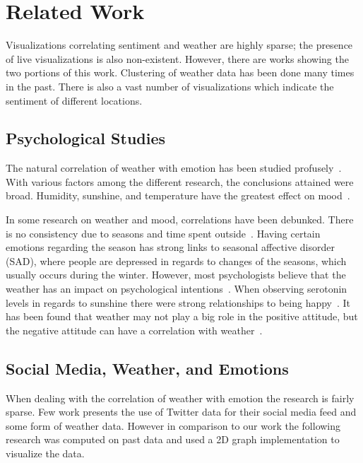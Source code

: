 \section{Related Work}

Visualizations correlating sentiment and weather are highly sparse; the presence of live visualizations is also non-existent. However, there are works showing the two portions of this work. Clustering of weather data has been done many times in the past. There is also a vast number of visualizations which indicate the sentiment of different locations.

\subsection{Psychological Studies}

The natural correlation of weather with emotion has been studied profusely~\cite{bollen2011twitter,denissen2008effects,hannak2012tweetin,howarth1984multidimensional,lambert2002effect}. With various factors among the different research, the conclusions attained were broad. Humidity, sunshine, and temperature have the greatest effect on mood~\cite{bollen2011twitter}.

In some research on weather and mood, correlations have been debunked. There is no consistency due to seasons and time spent outside~\cite{denissen2008effects}. Having certain emotions regarding the season has strong links to seasonal affective disorder (SAD), where people are depressed in regards to changes of the seasons, which usually occurs during the winter. However, most psychologists believe that the weather has an impact on psychological intentions~\cite{hannak2012tweetin}. When observing serotonin levels in regards to sunshine there were strong relationships to being happy~\cite{howarth1984multidimensional}. It has been found that weather may not play a big role in the positive attitude, but the negative attitude can have a correlation with weather~\cite{lambert2002effect}.


\subsection{Social Media, Weather, and Emotions}

When dealing with the correlation of weather with emotion the research is fairly sparse. Few work presents the use of Twitter data for their social media feed and some form of weather data. However in comparison to our work the following research was computed on past data and used a 2D graph implementation to visualize the data.

